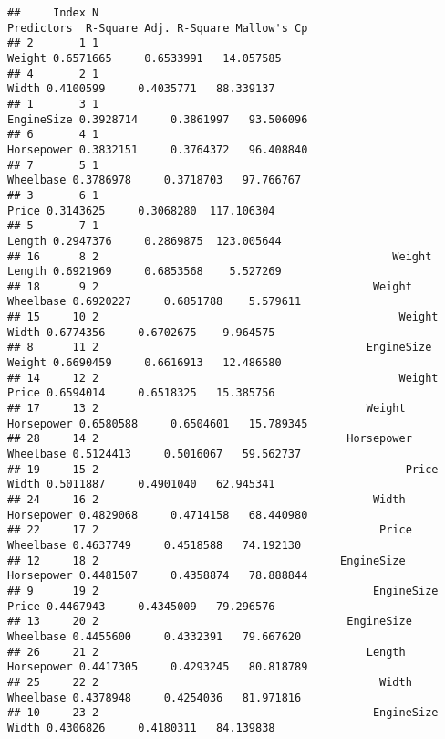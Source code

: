 \documentclass[
]{book}
\begin{document}
\begin{verbatim}
##     Index N                                                Predictors  R-Square Adj. R-Square Mallow's Cp
## 2       1 1                                                    Weight 0.6571665     0.6533991   14.057585
## 4       2 1                                                     Width 0.4100599     0.4035771   88.339137
## 1       3 1                                                EngineSize 0.3928714     0.3861997   93.506096
## 6       4 1                                                Horsepower 0.3832151     0.3764372   96.408840
## 7       5 1                                                 Wheelbase 0.3786978     0.3718703   97.766767
## 3       6 1                                                     Price 0.3143625     0.3068280  117.106304
## 5       7 1                                                    Length 0.2947376     0.2869875  123.005644
## 16      8 2                                             Weight Length 0.6921969     0.6853568    5.527269
## 18      9 2                                          Weight Wheelbase 0.6920227     0.6851788    5.579611
## 15     10 2                                              Weight Width 0.6774356     0.6702675    9.964575
## 8      11 2                                         EngineSize Weight 0.6690459     0.6616913   12.486580
## 14     12 2                                              Weight Price 0.6594014     0.6518325   15.385756
## 17     13 2                                         Weight Horsepower 0.6580588     0.6504601   15.789345
## 28     14 2                                      Horsepower Wheelbase 0.5124413     0.5016067   59.562737
## 19     15 2                                               Price Width 0.5011887     0.4901040   62.945341
## 24     16 2                                          Width Horsepower 0.4829068     0.4714158   68.440980
## 22     17 2                                           Price Wheelbase 0.4637749     0.4518588   74.192130
## 12     18 2                                     EngineSize Horsepower 0.4481507     0.4358874   78.888844
## 9      19 2                                          EngineSize Price 0.4467943     0.4345009   79.296576
## 13     20 2                                      EngineSize Wheelbase 0.4455600     0.4332391   79.667620
## 26     21 2                                         Length Horsepower 0.4417305     0.4293245   80.818789
## 25     22 2                                           Width Wheelbase 0.4378948     0.4254036   81.971816
## 10     23 2                                          EngineSize Width 0.4306826     0.4180311   84.139838

\end{verbatim}
\end{document}
